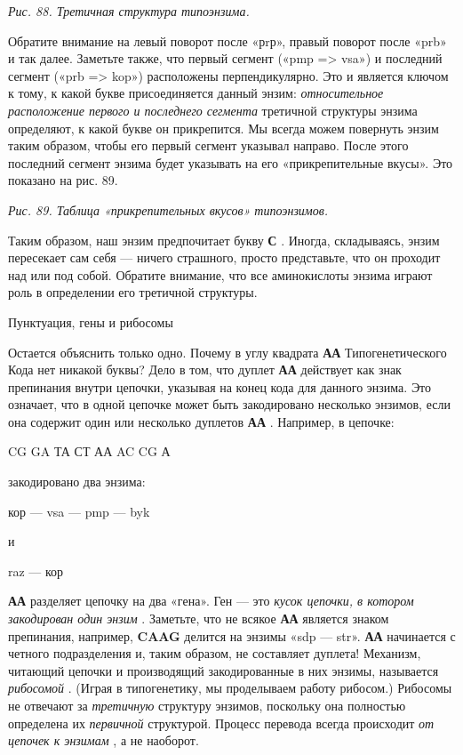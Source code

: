 \documentclass[../main.tex]{subfiles}
\begin{document}
\emph{Рис. 88. Третичная структура типоэнзима.}

Обратите внимание на левый поворот после «рrр», правый поворот после «prb» и так далее. Заметьте также, что первый сегмент («pmp =\textgreater{} vsa») и последний сегмент («prb =\textgreater{} kop») расположены перпендикулярно. Это и является ключом к тому, к какой букве присоединяется данный энзим: \emph{относительное расположение первого и последнего сегмента} третичной структуры энзима определяют, к какой букве он прикрепится. Мы всегда можем повернуть энзим таким образом, чтобы его первый сегмент указывал направо. После этого последний сегмент энзима будет указывать на его «прикрепительные вкусы». Это показано на рис. 89.

\emph{Рис. 89. Таблица «прикрепительных вкусов» типоэнзимов.}

Таким образом, наш энзим предпочитает букву \textbf{С} . Иногда, складываясь, энзим пересекает сам себя --- ничего страшного, просто представьте, что он проходит над или под собой. Обратите внимание, что все аминокислоты энзима играют роль в определении его третичной структуры.

Пунктуация, гены и рибосомы

Остается объяснить только одно. Почему в углу квадрата \textbf{АА} Типогенетического Кода нет никакой буквы? Дело в том, что дуплет \textbf{АА} действует как знак препинания внутри цепочки, указывая на конец кода для данного энзима. Это означает, что в одной цепочке может быть закодировано несколько энзимов, если она содержит один или несколько дуплетов \textbf{АА} . Например, в цепочке:

CG GA ТА СТ АА AC CG А

закодировано два энзима:

кор --- vsa --- pmp --- byk

и

raz --- кор

\textbf{АА} разделяет цепочку на два «гена». Ген --- это \emph{кусок цепочки, в котором закодирован один энзим} . Заметьте, что не всякое \textbf{АА} является знаком препинания, например, \textbf{CAAG} делится на энзимы «sdp --- str». \textbf{АА} начинается с четного подразделения и, таким образом, не составляет дуплета! Механизм, читающий цепочки и производящий закодированные в них энзимы, называется \emph{рибосомой} . (Играя в типогенетику, мы проделываем работу рибосом.) Рибосомы не отвечают за \emph{третичную} структуру энзимов, поскольку она полностью определена их \emph{первичной} структурой. Процесс перевода всегда происходит \emph{от цепочек к энзимам} , а не наоборот.
\end{document}
